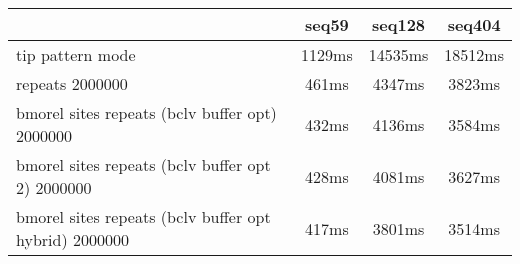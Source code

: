 \begin{tabular}{|l|c|c|c|}
\hline
 & seq59 & seq128 & seq404  \\
\hline
tip pattern mode &  1129ms &  14535ms &  18512ms\\
\hline
repeats 2000000 &  461ms &  4347ms &  3823ms\\
\hline
bmorel sites repeats (bclv buffer opt) 2000000 &  432ms &  4136ms &  3584ms\\
\hline
bmorel sites repeats (bclv buffer opt 2) 2000000 &  428ms &  4081ms &  3627ms\\
\hline
bmorel sites repeats (bclv buffer opt hybrid) 2000000 &  417ms &  3801ms &  3514ms\\
\hline
\end{tabular}
